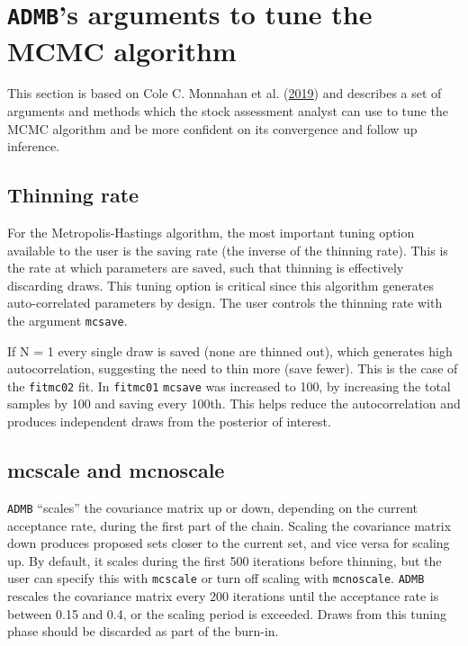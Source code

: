\documentclass[
]{book}
\begin{document}
\hypertarget{admbs-arguments-to-tune-the-mcmc-algorithm}{%
\section{\texorpdfstring{\texttt{ADMB}'s arguments to tune the MCMC algorithm}{ADMB's arguments to tune the MCMC algorithm}}\label{admbs-arguments-to-tune-the-mcmc-algorithm}}

This section is based on Cole C. Monnahan et al. (\protect\hyperlink{ref-monnahan2019}{2019}) and describes a set of arguments and methods which the stock assessment analyst can use to tune the MCMC algorithm and be more confident on its convergence and follow up inference.

\hypertarget{thinning-rate}{%
\subsection{Thinning rate}\label{thinning-rate}}

For the Metropolis-Hastings algorithm, the most important tuning option available to the user is the saving rate (the inverse of the thinning rate). This is the rate at which parameters are saved, such that thinning is effectively discarding draws. This tuning option is critical since this algorithm generates auto-correlated parameters by design. The user controls the thinning rate with the argument \texttt{mcsave}.

If N = 1 every single draw is saved (none are thinned out), which generates high autocorrelation, suggesting the need to thin more (save fewer). This is the case of the \texttt{fitmc02} fit. In \texttt{fitmc01} \texttt{mcsave} was increased to 100, by increasing the total samples by 100 and saving every 100th. This helps reduce the autocorrelation and produces independent draws from the posterior of interest.

\hypertarget{mcscale-and-mcnoscale}{%
\subsection{mcscale and mcnoscale}\label{mcscale-and-mcnoscale}}

\texttt{ADMB} ``scales'' the covariance matrix up or down, depending on the current acceptance rate, during the first part of the chain. Scaling the covariance matrix down produces proposed sets closer to the current set, and vice versa for scaling up. By default, it scales during the first 500 iterations before thinning, but the user can specify this with \texttt{mcscale} or turn off scaling with \texttt{mcnoscale}. \texttt{ADMB} rescales the covariance matrix every 200 iterations until the acceptance rate is between 0.15 and 0.4, or the scaling period is exceeded. Draws from this tuning phase should be discarded as part of the burn-in.
\end{document}
